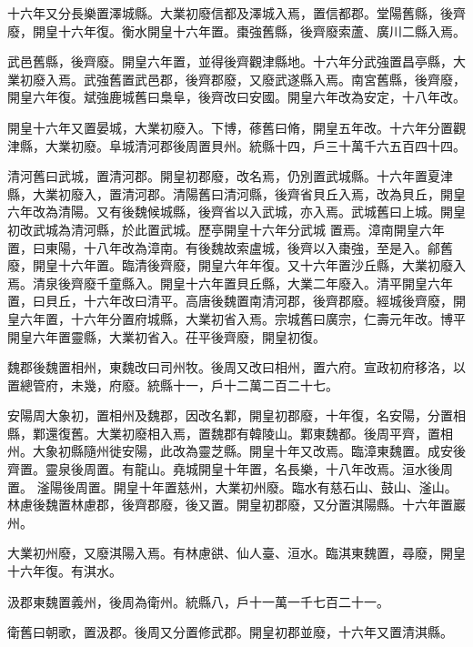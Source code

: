 \begin{pinyinscope}
 十六年又分長樂置澤城縣。大業初廢信都及澤城入焉，置信都郡。堂陽舊縣，後齊廢，開皇十六年復。衡水開皇十六年置。棗強舊縣，後齊廢索蘆、廣川二縣入焉。



 武邑舊縣，後齊廢。開皇六年置，並得後齊觀津縣地。十六年分武強置昌亭縣，大業初廢入焉。武強舊置武邑郡，後齊郡廢，又廢武遂縣入焉。南宮舊縣，後齊廢，開皇六年復。斌強鹿城舊曰梟阜，後齊改曰安國。開皇六年改為安定，十八年改。



 開皇十六年又置晏城，大業初廢入。下博，蓚舊曰脩，開皇五年改。十六年分置觀津縣，大業初廢。阜城清河郡後周置貝州。統縣十四，戶三十萬千六五百四十四。



 清河舊曰武城，置清河郡。開皇初郡廢，改名焉，仍別置武城縣。十六年置夏津縣，大業初廢入，置清河郡。清陽舊曰清河縣，後齊省貝丘入焉，改為貝丘，開皇六年改為清陽。又有後魏候城縣，後齊省以入武城，亦入焉。武城舊曰上城。開皇初改武城為清河縣，於此置武城。歷亭開皇十六年分武城
 置焉。漳南開皇六年置，曰東陽，十八年改為漳南。有後魏故索盧城，後齊以入棗強，至是入。鄃舊廢，開皇十六年置。臨清後齊廢，開皇六年年復。又十六年置沙丘縣，大業初廢入焉。清泉後齊廢千童縣入。開皇十六年置貝丘縣，大業二年廢入。清平開皇六年置，曰貝丘，十六年改曰清平。高唐後魏置南清河郡，後齊郡廢。經城後齊廢，開皇六年置，十六年分置府城縣，大業初省入焉。宗城舊曰廣宗，仁壽元年改。博平開皇六年置靈縣，大業初省入。茌平後齊廢，開皇初復。



 魏郡後魏置相州，東魏改曰司州牧。後周又改曰相州，置六府。宣政初府移洛，以置總管府，未幾，府廢。統縣十一，戶十二萬二百二十七。



 安陽周大象初，置相州及魏郡，因改名鄴，開皇初郡廢，十年復，名安陽，分置相縣，鄴還復舊。大業初廢相入焉，置魏郡有韓陵山。鄴東魏都。後周平齊，置相州。大象初縣隨州徙安陽，此改為靈芝縣。開皇十年又改焉。臨漳東魏置。成安後齊置。靈泉後周置。有龍山。堯城開皇十年置，名長樂，十八年改焉。洹水後周置。
 滏陽後周置。開皇十年置慈州，大業初州廢。臨水有慈石山、鼓山、滏山。林慮後魏置林慮郡，後齊郡廢，後又置。開皇初郡廢，又分置淇陽縣。十六年置巖州。



 大業初州廢，又廢淇陽入焉。有林慮谼、仙人臺、洹水。臨淇東魏置，尋廢，開皇十六年復。有淇水。



 汲郡東魏置義州，後周為衛州。統縣八，戶十一萬一千七百二十一。



 衛舊曰朝歌，置汲郡。後周又分置修武郡。開皇初郡並廢，十六年又置清淇縣。




\end{pinyinscope}
